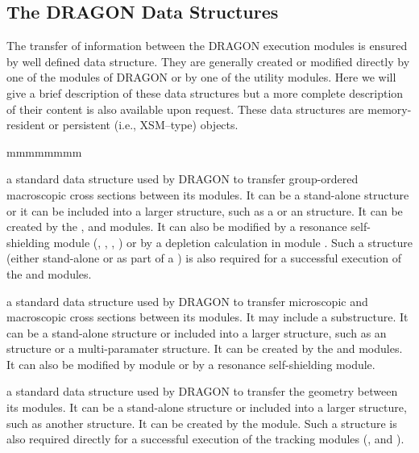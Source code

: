\subsection{The DRAGON Data Structures}\label{sect:DragonDataStructures}

The transfer of information between the DRAGON execution modules is
ensured by well defined data structure. They are generally created or
modified directly by one of the modules of DRAGON or by one of the utility
modules. Here we will give a brief description of these data structures but a
more complete description of their content is also available upon
request.\cite{DragonDataStructures} These data structures are memory-resident or
persistent (i.e., XSM--type) objects.

\begin{ListeDeDescription}{mmmmmmmm}

\item[\dds{macrolib}]  a standard data structure used by DRAGON to transfer
group-ordered macroscopic cross sections between its modules. It can be a
stand-alone structure or it can be included into a larger structure, such as a
 or an  structure. It can be created by the
,  and  modules. It can also be modified
by a resonance self-shielding module (, , , ) or
by a depletion calculation in module . Such a structure (either stand-alone
or as part of a ) is also required for a successful execution of the
 and  modules.

\item[\dds{microlib}] a standard data structure used by DRAGON to transfer
microscopic and macroscopic cross sections between its modules. It may
include a  substructure. It can be a stand-alone structure or
included into a larger structure, such as an  structure or a
multi-paramater structure. It can be created by the  and  modules.
It can also be modified by module  or by a resonance self-shielding module. 

\item[\dds{geometry}] a standard data structure used by DRAGON to transfer
the geometry between its modules. It can be a stand-alone structure or
included into a larger structure, such as another  structure. It can be created by the  module. Such a structure is also
required directly for a successful execution of the tracking modules (,
 and ).


\end{ListeDeDescription}
